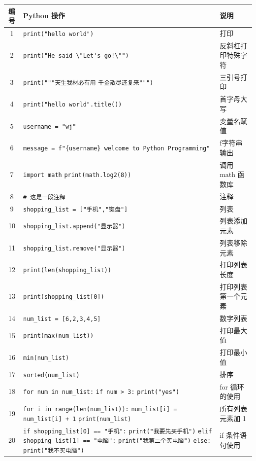 \documentclass{article}
\begin{document}
\begin{longtable}{|c|p{10cm}|l|}
\hline
编号 & Python 操作 & 说明 \\
\hline
1 & \verb|print("hello world")| & 打印 \\
\hline
2 & \verb|print("He said \"Let's go!\"")| & 反斜杠打印特殊字符 \\
\hline
3 & \verb|print("""天生我材必有用| \newline \verb|千金散尽还复来""")| & 三引号打印 \\
\hline
4 & \verb|print("hello world".title())| & 首字母大写 \\
\hline
5 & \verb|username = "wj"| & 变量名赋值 \\
\hline
6 & \verb|message = f"{username} welcome to Python Programming"| & f字符串输出 \\
\hline
7 & \verb|import math| \newline \verb|print(math.log2(8))| & 调用 math 函数库 \\
\hline
8 & \verb|# 这是一段注释| & 注释 \\
\hline
9 & \verb|shopping_list = ["手机","键盘"]| & 列表 \\
\hline
10 & \verb|shopping_list.append("显示器")| & 列表添加元素 \\
\hline
11 & \verb|shopping_list.remove("显示器")| & 列表移除元素 \\
\hline
12 & \verb|print(len(shopping_list))| & 打印列表长度 \\
\hline
13 & \verb|print(shopping_list[0])| & 打印列表第一个元素 \\
\hline
14 & \verb|num_list = [6,2,3,4,5]| & 数字列表 \\
\hline
15 & \verb|print(max(num_list))| & 打印最大值 \\
\hline
16 & \verb|min(num_list)| & 打印最小值 \\
\hline
17 & \verb|sorted(num_list)| & 排序 \\
\hline
18 & \verb|for num in num_list:| \newline \verb|if num > 3:| \newline \verb|print("yes")| & for 循环的使用 \\
\hline
19 & \verb|for i in range(len(num_list)):| \newline \verb|num_list[i] = num_list[i] + 1| \newline \verb|print(num_list)| & 所有列表元素加 1 \\
\hline
20 & \verb|if shopping_list[0] == "手机":| \newline \verb|print("我要先买手机")| \newline \verb|elif shopping_list[1] == "电脑":| \newline \verb|print("我第二个买电脑")| \newline \verb|else:| \newline \verb|print("我不买电脑")| & if 条件语句使用 \\

\end{longtable}
\end{document}
